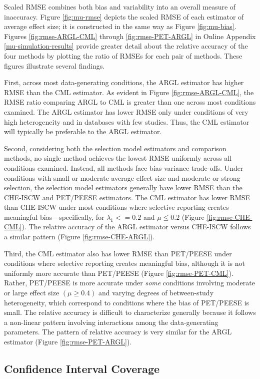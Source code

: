 \documentclass[
  man, donotrepeattitle,floatsintext]{apa7}
\begin{document}
Scaled RMSE combines both bias and variability into an overall measure of inaccuracy.
Figure \ref{fig:mu-rmse} depicts the scaled RMSE of each estimator of average effect size; it is constructed in the same way as Figure \ref{fig:mu-bias}.
Figures \ref{fig:rmse-ARGL-CML} through \ref{fig:rmse-PET-ARGL} in Online Appendix \ref{mu-simulation-results} provide greater detail about the relative accuracy of the four methods by plotting the ratio of RMSEs for each pair of methods.
These figures illustrate several findings.

First, across most data-generating conditions, the ARGL estimator has higher RMSE than the CML estimator. As evident in Figure \ref{fig:rmse-ARGL-CML}, the RMSE ratio comparing ARGL to CML is greater than one across most conditions examined.
The ARGL estimator has lower RMSE only under conditions of very high heterogeneity and in databases with few studies.
Thus, the CML estimator will typically be preferable to the ARGL estimator.

Second, considering both the selection model estimators and comparison methods, no single method achieves the lowest RMSE uniformly across all conditions examined.
Instead, all methods face bias-variance trade-offs.
Under conditions with small or moderate average effect size and moderate or strong selection, the selection model estimators generally have lower RMSE than the CHE-ISCW and PET/PEESE estimators.
The CML estimator has lower RMSE than CHE-ISCW under most conditions where selective reporting creates meaningful bias---specifically, for \(\lambda_1 <= 0.2\) and \(\mu \leq 0.2\) (Figure \ref{fig:rmse-CHE-CML}).
The relative accuracy of the ARGL estimator versus CHE-ISCW follows a similar pattern (Figure \ref{fig:rmse-CHE-ARGL}).

Third, the CML estimator also has lower RMSE than PET/PEESE under conditions where selective reporting creates meaningful bias, although it is not uniformly more accurate than PET/PEESE (Figure \ref{fig:rmse-PET-CML}).
Rather, PET/PEESE is more accurate under \emph{some} conditions involving moderate or large effect size \((\mu \geq 0.4)\) and varying degrees of between-study heterogeneity,
which correspond to conditions where the bias of PET/PEESE is small.
The relative accuracy is difficult to characterize generally because it follows a non-linear pattern involving interactions among the data-generating parameters.
The pattern of relative accuracy is very similar for the ARGL estimator (Figure \ref{fig:rmse-PET-ARGL}).

\subsection{Confidence Interval Coverage}\label{confidence-interval-coverage}
\end{document}

